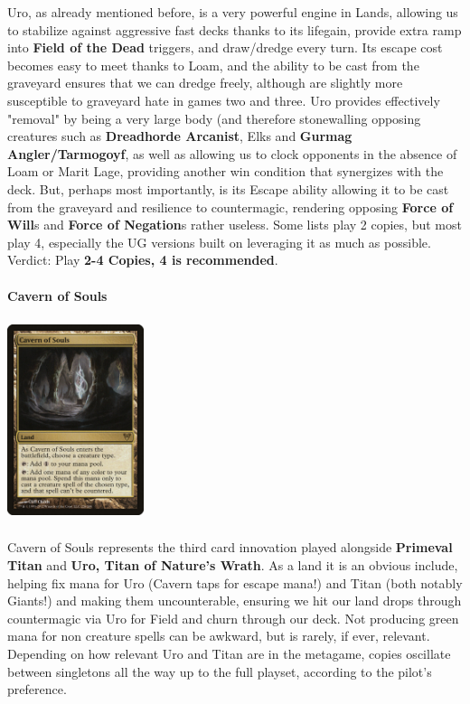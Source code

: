 \documentclass{report}
\begin{document}
Uro, as already mentioned before, is a very powerful engine in Lands, allowing us to stabilize against aggressive fast decks thanks to its lifegain, provide extra ramp into \textbf{Field of the Dead} triggers, and draw/dredge every turn. Its escape cost becomes easy to meet thanks to Loam, and the ability to be cast from the graveyard ensures that we can dredge freely, although are slightly more susceptible to graveyard hate in games two and three. Uro provides effectively "removal" by being a very large body (and therefore stonewalling opposing creatures such as \textbf{Dreadhorde Arcanist}, Elks and \textbf{Gurmag Angler/Tarmogoyf}, as well as allowing us to clock opponents in the absence of Loam or Marit Lage, providing another win condition that synergizes with the deck. But, perhaps most importantly, is its Escape ability allowing it to be cast from the graveyard and resilience to countermagic, rendering opposing \textbf{Force of Will}s and \textbf{Force of Negation}s rather useless. Some lists play 2 copies, but most play 4, especially the UG versions built on leveraging it as much as possible.\\
Verdict: Play \textbf{2-4 Copies, 4 is recommended}.\\\\
\newpage
\textbf{Cavern of Souls}
\begin{center}
\includegraphics [width = 4cm, height = 6cm] {cavern-of-souls}
\end{center}
Cavern of Souls represents the third card innovation played alongside \textbf{Primeval Titan} and \textbf{Uro, Titan of Nature's Wrath}. As a land it is an obvious include, helping fix mana for Uro (Cavern taps for escape mana!) and Titan (both notably Giants!) and making them uncounterable, ensuring we hit our land drops through countermagic via Uro for Field and churn through our deck. Not producing green mana for non creature spells can be awkward, but is rarely, if ever, relevant. Depending on how relevant Uro and Titan are in the metagame, copies oscillate between singletons all the way up to the full playset, according to the pilot's preference.
\end{document}
